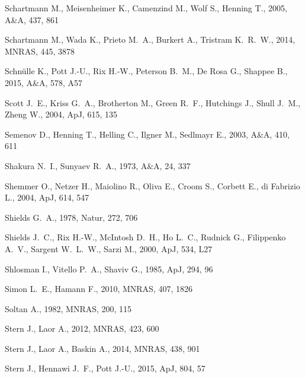 \documentclass[a4paper,fleqn,usenatbib]{mnras}
\begin{document}
\begin{thebibliography}{99}
 Schartmann M., Meisenheimer K., Camenzind M., Wolf S., Henning T., 2005, A\&A, 437, 861 

 Schartmann M., Wada K., Prieto M.~A., Burkert A., Tristram K.~R.~W., 2014, MNRAS, 445, 3878
 
 Schn{\"u}lle K., Pott J.-U., Rix H.-W., Peterson B.~M., De Rosa G., Shappee B., 2015, A\&A, 578, A57 

 Scott J.~E., Kriss G.~A., Brotherton M., Green R.~F., Hutchings J., Shull J.~M., Zheng W., 2004, ApJ, 615, 135 

 Semenov D., Henning T., Helling C., Ilgner M., Sedlmayr E., 2003, A\&A, 410, 611 

 Shakura N.~I., Sunyaev R.~A., 1973, A\&A, 24, 337 

 Shemmer O., Netzer H., Maiolino R., Oliva E., Croom S., Corbett E., di Fabrizio L., 2004, ApJ, 614, 547 

 Shields G.~A., 1978, Natur, 272, 706 

 Shields J.~C., Rix H.-W., McIntosh D.~H., Ho L.~C., Rudnick G., Filippenko A.~V., Sargent W.~L.~W., Sarzi M., 2000, ApJ, 534, L27 

 Shlosman I., Vitello P.~A., Shaviv G., 1985, ApJ, 294, 96
 
 Simon L.~E., Hamann F., 2010, MNRAS, 407, 1826
 
 Soltan A., 1982, MNRAS, 200, 115 

 Stern J., Laor A., 2012, MNRAS, 423, 600 

 Stern J., Laor A., Baskin A., 2014, MNRAS, 438, 901 

 Stern J., Hennawi J.~F., Pott J.-U., 2015, ApJ, 804, 57 


\end{thebibliography}
\end{document}
